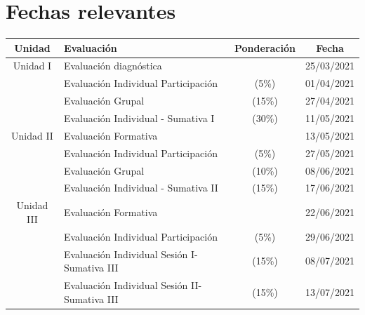 \documentclass[12 pt,letterpaper]{article}
\begin{document}
\section{Fechas relevantes}

\begin{tabular}{|c|l|c|c|}
	\hline
	Unidad & Evaluación & Ponderación & Fecha \\
	\hline
	Unidad I & Evaluación diagnóstica & & 25/03/2021 \\
	\hline
	& Evaluación Individual Participación & (5\%) & 01/04/2021 \\
	\hline
	& Evaluación Grupal & (15\%) & 27/04/2021 \\
	\hline
	& Evaluación Individual - Sumativa I & (30\%) & 11/05/2021 \\
	\hline
	Unidad II & Evaluación Formativa & & 13/05/2021 \\
	\hline
	& Evaluación Individual Participación & (5\%) & 27/05/2021 \\
	\hline
	& Evaluación Grupal & (10\%) & 08/06/2021 \\
	\hline
	& Evaluación Individual - Sumativa II & (15\%) & 17/06/2021 \\
	\hline
	Unidad III & Evaluación Formativa & & 22/06/2021 \\
	\hline
	& Evaluación Individual Participación & (5\%) & 29/06/2021 \\
	\hline
	& Evaluación Individual Sesión I- Sumativa III & (15\%) & 08/07/2021 \\
	\hline
	& Evaluación Individual Sesión II- Sumativa III & (15\%) & 13/07/2021 \\
	\hline
\end{tabular}
\end{document}
